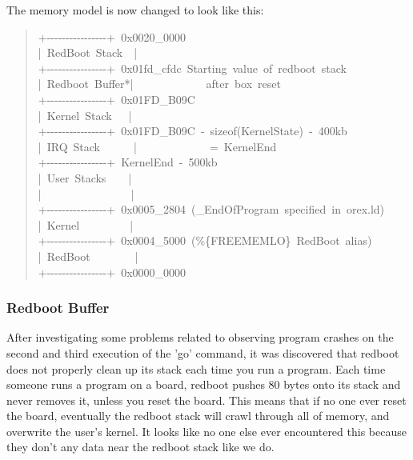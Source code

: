 \documentclass[letterpaper]{article}
\begin{document}
The memory model is now changed to look like this:
%
\begin{quote}{\ttfamily \raggedright \noindent
+-{}-{}-{}-{}-{}-{}-{}-{}-{}-{}-{}-{}-{}-{}-{}-+~0x0020\_0000\\
|~RedBoot~Stack~~|\\
+-{}-{}-{}-{}-{}-{}-{}-{}-{}-{}-{}-{}-{}-{}-{}-+~0x01fd\_cfdc~Starting~value~of~redboot~stack\\
|~Redboot~Buffer*|~~~~~~~~~~~~~after~box~reset\\
+-{}-{}-{}-{}-{}-{}-{}-{}-{}-{}-{}-{}-{}-{}-{}-+~0x01FD\_B09C\\
|~Kernel~Stack~~~|\\
+-{}-{}-{}-{}-{}-{}-{}-{}-{}-{}-{}-{}-{}-{}-{}-+~0x01FD\_B09C~-~sizeof(KernelState)~-~400kb\\
|~IRQ~Stack~~~~~~|~~~~~~~~~~~~~=~KernelEnd\\
+-{}-{}-{}-{}-{}-{}-{}-{}-{}-{}-{}-{}-{}-{}-{}-+~KernelEnd~-~500kb\\
|~User~Stacks~~~~|\\
|~~~~~~~~~~~~~~~~|\\
+-{}-{}-{}-{}-{}-{}-{}-{}-{}-{}-{}-{}-{}-{}-{}-+~0x0005\_2804~(\_EndOfProgram~specified~in~orex.ld)\\
|~Kernel~~~~~~~~~|\\
+-{}-{}-{}-{}-{}-{}-{}-{}-{}-{}-{}-{}-{}-{}-{}-+~0x0004\_5000~(\%\{FREEMEMLO\}~RedBoot~alias)\\
|~RedBoot~~~~~~~~|\\
+-{}-{}-{}-{}-{}-{}-{}-{}-{}-{}-{}-{}-{}-{}-{}-+~0x0000\_0000
}
\end{quote}


\subsubsection{Redboot Buffer%
  \label{redboot-buffer}%
}

After investigating some problems related to observing program crashes on the second and third execution of the 'go' command, it was discovered that redboot does not properly clean up its stack each time you run a program.  Each time someone runs a program on a board, redboot pushes 80 bytes onto its stack and never removes it, unless you reset the board.  This means that if no one ever reset the board, eventually the redboot stack will crawl through all of memory, and overwrite the user's kernel.  It looks like no one else ever encountered this because they don't any data near the redboot stack like we do.
\end{document}
